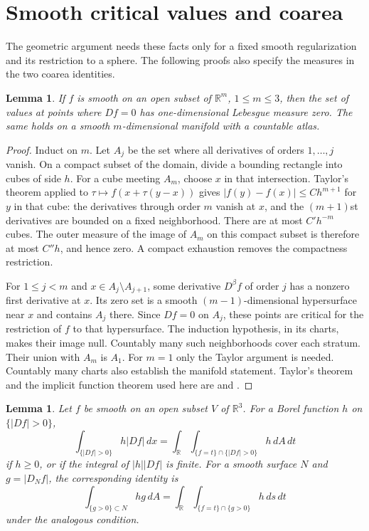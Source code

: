 \documentclass[11pt]{article}
\newtheorem{lemma}[theorem]{Lemma}
\theoremstyle{remark}
\newcommand{\R}{\mathbb R}
\newcommand{\dd}{\,dx}
\newcommand{\dA}{\,dA}
\newcommand{\ds}{\,ds}
\begin{document}
\appendix
\section{Smooth critical values and coarea}\label{sec:coarea}

The geometric argument needs these facts only for a fixed smooth
regularization and its restriction to a sphere. The following
proofs also specify the measures in the two coarea identities.

\begin{lemma}\label{lem:values}
If $f$ is smooth on an open subset of $\R^m$, $1\leq m\leq3$,
then the set of values at points where $Df=0$ has
one-dimensional Lebesgue measure zero. The same holds on a smooth
$m$-dimensional manifold with a countable atlas.
\end{lemma}

\begin{proof}
Induct on $m$. Let $A_j$ be the set where all derivatives of
orders $1,\ldots,j$ vanish. On a compact subset of the domain,
divide a bounding rectangle into cubes of side $h$.
For a cube meeting $A_m$, choose $x$ in that intersection.
Taylor's theorem applied to $\tau\mapsto f(x+\tau(y-x))$
gives $|f(y)-f(x)|\leq Ch^{m+1}$ for $y$ in that cube:
the derivatives through order $m$ vanish at $x$, and the
$(m+1)$st derivatives are bounded on a fixed neighborhood.
There are at most $C'h^{-m}$ cubes. The outer measure of the
image of $A_m$ on this compact subset is therefore at most
$C''h$, and hence zero. A compact exhaustion removes the
compactness restriction.

For $1\leq j<m$ and $x\in A_j\setminus A_{j+1}$,
some derivative $D^\beta f$ of order $j$ has a nonzero
first derivative at $x$. Its zero set is a smooth
$(m-1)$-dimensional hypersurface near $x$ and contains $A_j$
there. Since $Df=0$ on $A_j$, these points are critical
for the restriction of $f$ to that hypersurface. The induction
hypothesis, in its charts, makes their image null.
Countably many such neighborhoods cover each stratum.
Their union with $A_m$ is $A_1$. For $m=1$ only the Taylor
argument is needed. Countably many charts also establish the
manifold statement.
Taylor's theorem and the implicit function theorem used here
are \cite[Theorem 4.3.2]{LeblI} and
\cite[Theorem 8.5.6]{LeblII}.
\end{proof}

\begin{lemma}\label{lem:coarea}
Let $f$ be smooth on an open subset $V$ of $\R^3$. For a Borel
function $h$ on $\{|Df|>0\}$,
\begin{equation}\label{eq:volumecoarea}
 \int_{\{|Df|>0\}}h|Df|\dd
   =\int_\R\int_{\{f=t\}\cap\{|Df|>0\}}h\dA\,dt
\end{equation}
if $h\geq0$, or if the integral of $|h||Df|$ is finite.
For a smooth surface $N$ and $g=|D_Nf|$, the corresponding identity is
\begin{equation}\label{eq:surfacecoarea}
 \int_{\{g>0\}\subset N}hg\dA
   =\int_\R\int_{\{f=t\}\cap\{g>0\}}h\ds\,dt
\end{equation}
under the analogous condition.
\end{lemma}
\end{document}
